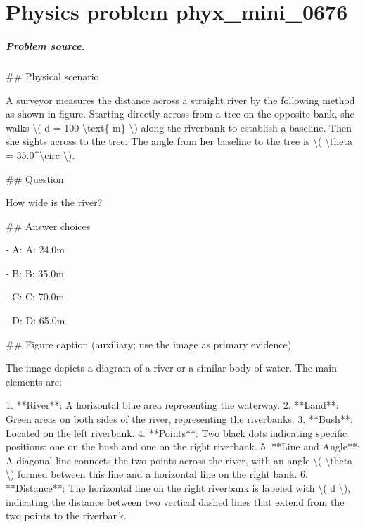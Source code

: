 
\chapter{Physics problem phyx\_mini\_0676}
\label{ch:PhyXMiniProblems_problem_phyx_mini_0676}

\paragraph{Problem source.}
\#\# Physical scenario

A surveyor measures the distance across a straight river by the following method as shown in figure. Starting directly across from a tree on the opposite bank, she walks \textbackslash{}( d = 100 \textbackslash{}text\{ m\} \textbackslash{}) along the riverbank to establish a baseline. Then she sights across to the tree. The angle from her baseline to the tree is \textbackslash{}( \textbackslash{}theta = 35.0\textasciicircum{}\textbackslash{}circ \textbackslash{}).

\#\# Question

How wide is the river?

\#\# Answer choices

- A: A: 24.0m

- B: B: 35.0m

- C: C: 70.0m

- D: D: 65.0m

\#\# Figure caption (auxiliary; use the image as primary evidence)

The image depicts a diagram of a river or a similar body of water. The main elements are:

1. **River**: A horizontal blue area representing the waterway.
2. **Land**: Green areas on both sides of the river, representing the riverbanks.
3. **Bush**: Located on the left riverbank.
4. **Points**: Two black dots indicating specific positions: one on the bush and one on the right riverbank.
5. **Line and Angle**: A diagonal line connects the two points across the river, with an angle \textbackslash{}( \textbackslash{}theta \textbackslash{}) formed between this line and a horizontal line on the right bank.
6. **Distance**: The horizontal line on the right riverbank is labeled with \textbackslash{}( d \textbackslash{}), indicating the distance between two vertical dashed lines that extend from the two points to the riverbank.

